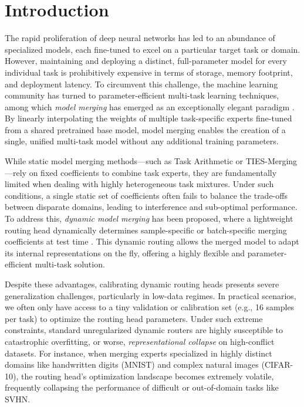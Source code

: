 \section{Introduction}
\label{sec:intro}

The rapid proliferation of deep neural networks has led to an abundance of specialized models, each fine-tuned to excel on a particular target task or domain. However, maintaining and deploying a distinct, full-parameter model for every individual task is prohibitively expensive in terms of storage, memory footprint, and deployment latency. To circumvent this challenge, the machine learning community has turned to parameter-efficient multi-task learning techniques, among which \emph{model merging} has emerged as an exceptionally elegant paradigm \cite{wortsman2022robust, ilharco2022editing, tiesmerging}. By linearly interpolating the weights of multiple task-specific experts fine-tuned from a shared pretrained base model, model merging enables the creation of a single, unified multi-task model without any additional training parameters.

While static model merging methods---such as Task Arithmetic \cite{ilharco2022editing} or TIES-Merging \cite{tiesmerging}---rely on fixed coefficients to combine task experts, they are fundamentally limited when dealing with highly heterogeneous task mixtures. Under such conditions, a single static set of coefficients often fails to balance the trade-offs between disparate domains, leading to interference and sub-optimal performance. To address this, \emph{dynamic model merging} has been proposed, where a lightweight routing head dynamically determines sample-specific or batch-specific merging coefficients at test time \cite{adamerging}. This dynamic routing allows the merged model to adapt its internal representations on the fly, offering a highly flexible and parameter-efficient multi-task solution.

Despite these advantages, calibrating dynamic routing heads presents severe generalization challenges, particularly in low-data regimes. In practical scenarios, we often only have access to a tiny validation or calibration set (e.g., 16 samples per task) to optimize the routing head parameters. Under such extreme constraints, standard unregularized dynamic routers are highly susceptible to catastrophic overfitting, or worse, \emph{representational collapse} on high-conflict datasets. For instance, when merging experts specialized in highly distinct domains like handwritten digits (MNIST) and complex natural images (CIFAR-10), the routing head's optimization landscape becomes extremely volatile, frequently collapsing the performance of difficult or out-of-domain tasks like SVHN.

